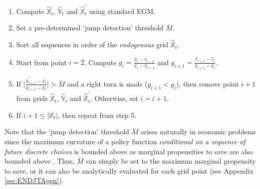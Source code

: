 \documentclass[12pt]{article}
\begin{document}
\begin{tcolorbox}[
colframe=black!100,
colback=white!10,
coltitle=white!100!black,  
fonttitle=\bfseries,
adjusted title= Box 1: FUES method]
\begin{enumerate}
    \item Compute $\hat{\mathbb{X}}_{t}$, $\hat{\mathbb{V}}_{t}$ and $\hat{\mathbb{X}}_{t}^{\prime}$ using standard EGM.
    \item Set a pre-determined `jump detection' threshold $\bar{M}$.
    \item Sort all sequences in order of the \textit{endogenous} grid $\hat{\mathbb{X}}_{t}$.
    \item Start from point $i= 2$. Compute $g_{i} = \frac{\hat{v}_{i} - \hat{v}_{i-1}}{\hat{x}_{i}- \hat{x}_{i-1}}$ and $g_{i+1} = \frac{\hat{v}_{i+1} - \hat{v}_{i}}{\hat{x}_{i+1}- \hat{x}_{i}}$.
    \item If $\vert \frac{\hat{x}^{\prime}_{i+1} - {x}^{\prime}_{i}}{\hat{x}_{i+1} - \hat{x}_{i}}\vert >\bar{M}$ and a right turn is made ($g_{i+1}< g_{i}$), then remove point $i+1$ from grids $\hat{\mathbb{X}}_{t}$, $\hat{\mathbb{V}}_{t}$ and $\hat{\mathbb{X}}_{t}^{\prime}$. Otherwise, set $i= i+1$.
    \item If $i+1\leq \vert \hat{\mathbb{X}}_{t}\vert$, then repeat from step 5. 
\end{enumerate}
\end{tcolorbox}
%
Note that the `jump detection' threshold $\bar{M}$ arises naturally in economic problems since the maximum curvature of a policy function \textit{conditional on a  sequence of future discrete choices} is bounded above as marginal propensities to save are also bounded above \citep{White2015, Carroll2023}. Thus, $\bar{M}$ can simply be set to the maximum marginal propensity to save, or it can also be analytically evaluated for each grid point (see Appendix \ref{sec:ENDJTAppx}). 
\end{document}
